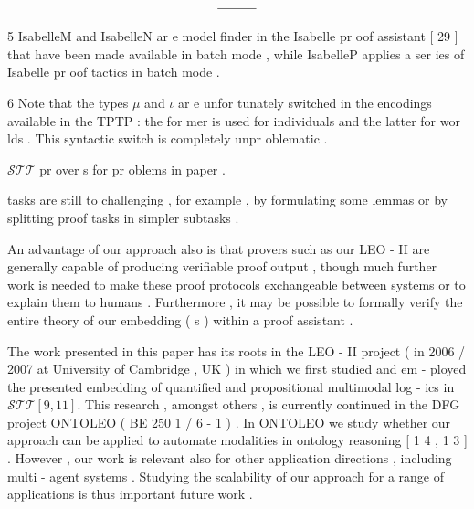 \documentclass[10pt]{article}
\begin{document}
\begin{align*}
 \rule{3em}{0.4pt} 
\end{align*}

{\scriptsize 5 } {\small IsabelleM and IsabelleN ar e model finder in the Isabelle pr oof assistant [ 29 ] that } 
 {\small have been made available in batch mode , while IsabelleP applies a ser ies of Isabelle } 
 {\small pr oof tactics in batch mode . } 

{\scriptsize 6 } {\small Note that the types }  $ \mu $  {\small and }  $ \iota $  {\small ar e unfor tunately switched in the encodings available in } 
 {\small the TPTP : the for mer is used for individuals and the latter for wor lds . This syntactic } 
 {\small switch is completely unpr oblematic . } 


\newpage


\vspace*{3ex}\centerline{}\vspace*{3ex}



  $ \mathcal{STT} $  {\small pr over s for pr oblems in paper . } 


\newpage
\noindent tasks are still to challenging , for example , by formulating some lemmas or by 
 splitting proof tasks in simpler subtasks . 

An advantage of our approach also is that provers such as our LEO - II are 
 generally capable of producing verifiable proof output , \quad though much further 
 work is needed to make these proof protocols exchangeable between systems or 
 to explain them to humans . Furthermore , it may be possible to formally verify 
 the entire theory of our embedding ( s ) within a proof assistant . 

The work presented in this paper has its roots in the LEO - II project \quad ( in 
 2006 / 2007 at University of Cambridge , UK ) in which we first studied and em - 
 ployed the presented embedding of quantified and propositional multimodal log - 
 ics in  $ \mathcal{STT}   [  9  ,   1  1  ]  . $  This research , amongst others , is currently continued in the 
 DFG project ONTOLEO ( BE 250 1 / 6 - 1 ) . In ONTOLEO we study whether our 
 approach can be applied to automate modalities in ontology reasoning [ 1 4 , 1 3 ] . 
 However , our work is relevant also for other application directions , including 
 multi - agent systems . \quad Studying the scalability of our approach for a range of 
 applications is thus important future work . 
\end{document}
